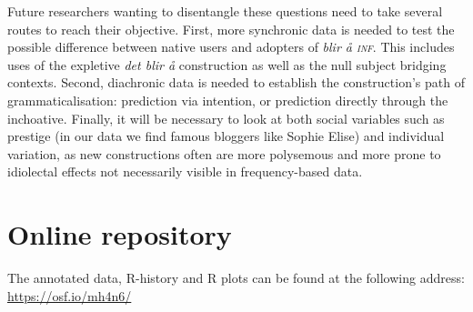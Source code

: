 \documentclass[output=paper,colorlinks,citecolor=brown]{langscibook}
\begin{document}
Future researchers wanting to disentangle these questions need to take several routes to reach their objective. First, more synchronic data is needed to test the possible difference between native users and adopters of \textit{blir å \textsc{inf}}. This includes uses of the expletive \textit{det blir å} construction as well as the null subject bridging contexts. Second, diachronic data is needed to establish the construction’s path of grammaticalisation: prediction via intention, or prediction directly through the inchoative. Finally, it will be necessary to look at both social variables such as prestige (in our data we find famous bloggers like Sophie Elise) and individual variation, as new constructions often are more polysemous and more prone to idiolectal effects not necessarily visible in frequency-based data.

\section{Online repository}\label{sec:06:6}
The annotated data, R-history and R plots can be found at the following address: \url{https://osf.io/mh4n6/}

\sloppy
\printbibliography[heading=subbibliography,notkeyword=this]
\end{document}
